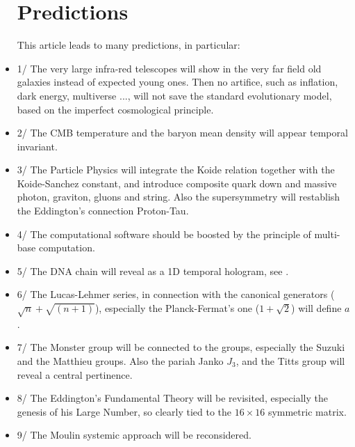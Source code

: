 \documentclass[twoside,draft]{article}
\begin{document}
\begin{sloppypar}
\begin{itemize}
\section{Predictions}

 

      This article leads to many predictions, in particular:
\item 1/  The very large infra-red telescopes will show in the very far field old galaxies instead of expected young ones. Then no artifice, such as inflation, dark energy, multiverse ..., will not save the standard evolutionary model, based on the imperfect cosmological principle.
\item 2/ The CMB temperature and the baryon mean density will appear temporal invariant. 
\item 3/ The Particle Physics will integrate the Koide relation together with the Koide-Sanchez constant, and introduce composite quark down and massive photon, graviton, gluons and string. Also the supersymmetry will restablish the Eddington's connection Proton-Tau.
\item 4/ The computational software should be boosted by the principle of multi-base computation.
\item 5/ The DNA chain will reveal as a 1D temporal hologram, see \cite{Widom}.
\item 6/ The Lucas-Lehmer series, in connection with the canonical generators ($\sqrt{n}+\sqrt{(n+1)}$), especially the Planck-Fermat's one ($1+\sqrt2$) will define $a$.
\item 7/ The Monster group will be connected to the  groups, especially the Suzuki and the Matthieu groups. Also the pariah Janko $J_3$, and the Titts group will reveal a central pertinence.
\item 8/ The Eddington's Fundamental Theory will be revisited, especially the genesis of his Large Number, so clearly tied to the $16 \times 16$ symmetric matrix.
\item 9/ The Moulin systemic approach will be reconsidered.
\end{itemize}


\end{sloppypar}
\end{document}
